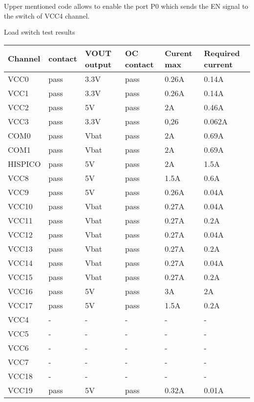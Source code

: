 	Upper mentioned code allows to enable the port P0 which sends the EN signal to the switch of VCC4 channel.
	
		\caption{Load switch test results}
		
		
		
		\begin{tabular}{p{2cm}p{2cm}p{2cm}p{2cm}p{2cm}p{2cm}}
			\toprule
			
			
			Channel & contact & VOUT output & OC contact & Curent max & Required current \\ \midrule
			VCC0 & pass & 3.3V & pass & 0.26A & 0.14A  \\ 
			VCC1 & pass & 3.3V & pass & 0.26A & 0.14A  \\ 
			VCC2 & pass & 5V & pass & 2A & 0.46A  \\ 
			VCC3 & pass & 3.3V & pass & 0,26 & 0.062A \\ 
			COM0 & pass & Vbat & pass & 2A & 0.69A  \\ 
			COM1 & pass & Vbat & pass & 2A & 0.69A  \\ 
			HISPICO & pass & 5V & pass & 2A & 1.5A \\ 
			VCC8 & pass & 5V & pass & 1.5A & 0.6A \\ 
			VCC9 & pass & 5V & pass & 0.26A & 0.04A \\ 
			VCC10 & pass & Vbat & pass & 0.27A & 0.04A \\ 
			VCC11 & pass & Vbat & pass & 0.27A & 0.2A \\ 
			VCC12 & pass & Vbat & pass & 0.27A & 0.04A \\ 
			VCC13 & pass & Vbat & pass & 0.27A & 0.2A \\ 
			VCC14 & pass & Vbat & pass & 0.27A & 0.04A \\ 
			VCC15 & pass & Vbat & pass & 0.27A & 0.2A \\ 
			VCC16 & pass & 5V & pass & 3A & 2A  \\ 
			VCC17 & pass & 5V & pass & 1.5A & 0.2A  \\ 
			VCC4 &  - &  - &  - &  - &  - \\ 
			VCC5 &  - &  - &  - &  - &  - \\ 
			VCC6 &  - &  - &  - &  - &  - \\ 
			VCC7 &  - &  - &  - &  - &  - \\ 
			VCC18 &  - &  - &  - &  - &  - \\ 
			VCC19 & pass & 5V & pass & 0.32A & 0.01A \\ 
			\bottomrule
		\end{tabular}
		\label{switchtest}\\
	
